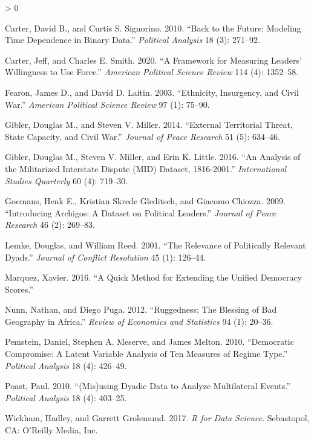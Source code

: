 \documentclass[
  11pt,
]{article}
\newlength{\cslhangindent}
\newenvironment{CSLReferences}[2] %
 {%
  \setlength{\parindent}{0pt}
  \ifodd #1 \everypar{\setlength{\hangindent}{\cslhangindent}}\ignorespaces\fi
  \ifnum #2 > 0
  \setlength{\parskip}{#2\baselineskip}
  \fi
 }%
 {}
\begin{document}
\begin{CSLReferences}{1}{0}
\leavevmode\hypertarget{ref-cartersignorino2010bf}{}%
Carter, David B., and Curtis S. Signorino. 2010. {``Back to the Future: Modeling Time Dependence in Binary Data.''} \emph{Political Analysis} 18 (3): 271--92.

\leavevmode\hypertarget{ref-cartersmith2020fml}{}%
Carter, Jeff, and Charles E. Smith. 2020. {``A Framework for Measuring Leaders' Willingness to Use Force.''} \emph{American Political Science Review} 114 (4): 1352--58.

\leavevmode\hypertarget{ref-fearonlaitin2003eicw}{}%
Fearon, James D., and David D. Laitin. 2003. {``Ethnicity, Insurgency, and Civil War.''} \emph{American Political Science Review} 97 (1): 75--90.

\leavevmode\hypertarget{ref-giblermiller2014etts}{}%
Gibler, Douglas M., and Steven V. Miller. 2014. {``External Territorial Threat, State Capacity, and Civil War.''} \emph{Journal of Peace Research} 51 (5): 634--46.

\leavevmode\hypertarget{ref-gibleretal2016amid}{}%
Gibler, Douglas M., Steven V. Miller, and Erin K. Little. 2016. {``An Analysis of the {M}ilitarized {I}nterstate {D}ispute {(MID)} Dataset, 1816-2001.''} \emph{International Studies Quarterly} 60 (4): 719--30.

\leavevmode\hypertarget{ref-goemansetal2009ia}{}%
Goemans, Henk E., Kristian Skrede Gleditsch, and Giacomo Chiozza. 2009. {``Introducing {A}rchigos: A Dataset on Political Leaders.''} \emph{Journal of Peace Research} 46 (2): 269--83.

\leavevmode\hypertarget{ref-lemkereed2001rprd}{}%
Lemke, Douglas, and William Reed. 2001. {``The Relevance of Politically Relevant Dyads.''} \emph{Journal of Conflict Resolution} 45 (1): 126--44.

\leavevmode\hypertarget{ref-marquez2016qme}{}%
Marquez, Xavier. 2016. {``A Quick Method for Extending the {U}nified {D}emocracy {S}cores.''}

\leavevmode\hypertarget{ref-nunnpuga2012r}{}%
Nunn, Nathan, and Diego Puga. 2012. {``Ruggedness: The Blessing of Bad Geography in {A}frica.''} \emph{Review of Economics and Statistics} 94 (1): 20--36.

\leavevmode\hypertarget{ref-pemsteinetal2010dc}{}%
Pemstein, Daniel, Stephen A. Meserve, and James Melton. 2010. {``Democratic Compromise: A Latent Variable Analysis of Ten Measures of Regime Type.''} \emph{Political Analysis} 18 (4): 426--49.

\leavevmode\hypertarget{ref-poast2010mdd}{}%
Poast, Paul. 2010. {``(Mis)using Dyadic Data to Analyze Multilateral Events.''} \emph{Political Analysis} 18 (4): 403--25.

\leavevmode\hypertarget{ref-wickhamgrolemund2017rds}{}%
Wickham, Hadley, and Garrett Grolemund. 2017. \emph{{R} for Data Science}. Sebastopol, CA: O'Reilly Media, Inc.

\end{CSLReferences}
\end{document}
